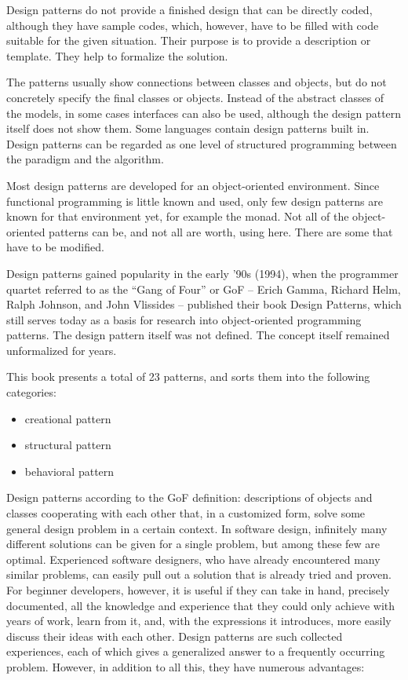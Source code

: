 \documentclass[margin=0px]{article}
\begin{document}
Design patterns do not provide a finished design that can be directly coded, although they have sample codes, which, however, have to be filled with code suitable for the given situation. Their purpose is to provide a description or template. They help to formalize the solution.

The patterns usually show connections between classes and objects, but do not concretely specify the final classes or objects. Instead of the abstract classes of the models, in some cases interfaces can also be used, although the design pattern itself does not show them. Some languages contain design patterns built in. Design patterns can be regarded as one level of structured programming between the paradigm and the algorithm.

Most design patterns are developed for an object-oriented environment. Since functional programming is little known and used, only few design patterns are known for that environment yet, for example the monad. Not all of the object-oriented patterns can be, and not all are worth, using here. There are some that have to be modified.

Design patterns gained popularity in the early '90s (1994), when the programmer quartet referred to as the ``Gang of Four'' or GoF -- Erich Gamma, Richard Helm, Ralph Johnson, and John Vlissides -- published their book Design Patterns, which still serves today as a basis for research into object-oriented programming patterns. The design pattern itself was not defined. The concept itself remained unformalized for years.

This book presents a total of 23 patterns, and sorts them into the following categories:
\begin{itemize}
    \item creational pattern
    \item structural pattern
    \item behavioral pattern
\end{itemize}

Design patterns according to the GoF definition: descriptions of objects and classes cooperating with each other that, in a customized form, solve some general design problem in a certain context. In software design, infinitely many different solutions can be given for a single problem, but among these few are optimal. Experienced software designers, who have already encountered many similar problems, can easily pull out a solution that is already tried and proven. For beginner developers, however, it is useful if they can take in hand, precisely documented, all the knowledge and experience that they could only achieve with years of work, learn from it, and, with the expressions it introduces, more easily discuss their ideas with each other. Design patterns are such collected experiences, each of which gives a generalized answer to a frequently occurring problem. However, in addition to all this, they have numerous advantages:
\end{document}
